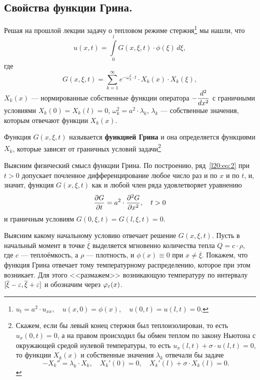 	\chapter{}
\label{lecture20}
\section{Свойства функции Грина.}
\label{lecture20section1}
Решая на прошлой лекции задачу о тепловом режиме стержня\footnote[1]{$u_t=a^2\cdot u_{xx},\quad u(x,0)=\phi(x),\quad u(0,t)=u(l,t)=0$.} мы нашли, что 
\begin{equation}\label{l20:eq:1}
	u(x,t)=\int\limits_0^l G(x,\xi,t)\cdot\phi(\xi)\,d\xi,
\end{equation} 
где 
\begin{equation}\label{l20:eq:2}
	G(x,\xi,t)=\sum\limits_{k=1}^{\infty}e^{-\omega_k^2\cdot t}\cdot X_k(x)\cdot X_k(\xi),
\end{equation}
$X_k(x)$ --- нормированные собственные функции оператора $\displaystyle -\frac{d^2}{dx^2}$ с граничными условиями $X_k(0)=X_k(l)=0$, $\omega_k^2=a^2\cdot \lambda_k$, $\lambda_k$ --- собственные значения, которым отвечают функции $X_k(x)$.

\begin{_definition}
	Функция $G(x,\xi,t)$ называется \textbf{функцией Грина} и она определяется функциями $X_k$, которые зависят от граничных условий задачи\footnote{Скажем, если бы левый конец стержня был теплоизолирован, то есть $u_x(0,t)=0$, а на правом происходил бы обмен теплом по закону Ньютона с окружающей средой нулевой температуры, то есть $u_x(l,t)+\sigma\cdot u(l,t)=0$, то функции $X_k(x)$ и собственные значения $\lambda_k$ отвечали бы задаче
		\begin{equation*}
			-X_k''=\lambda_k\cdot X_k,\quad X_k'(0)=0,\quad X_k'(l)+\sigma\cdot X_k(l)=0.
	\end{equation*}}
\end{_definition}

Выясним физический смысл функции Грина. По построению, ряд~\eqref{l20:eq:2} при $t>0$ допускает почленное дифференцирование любое число раз и по $x$ и по $t$, и, значит, функция $G(x,\xi,t)$ как и любой член ряда удовлетворяет уравнению
\begin{equation*}
	\frac{\partial G}{\partial t}=a^2\cdot\frac{\partial^2G}{\partial x^2},\quad t>0
\end{equation*}
и граничным условиям $G(0,\xi,t)=G(l,\xi,t)=0$.

Выясним какому начальному условию отвечает решение $G(x,\xi,t)$. Пусть в начальный момент в точке $\overline{\xi}$ выделяется мгновенно количества тепла $Q=c\cdot\rho$, где $c$ --- теплоёмкость, а $\rho$ --- плотность, и $\phi(x)\equiv0$ при $x\neq\overline{\xi}$. Покажем, что функция Грина отвечает тому температурному распределению, которое при этом возникает. Для этого <<размажем>> возникающую температуру по интервалу $[\overline{\xi}-\varepsilon,\overline{\xi}+\varepsilon]$ и обозначим через $\varphi_{\varepsilon}(x)$.




